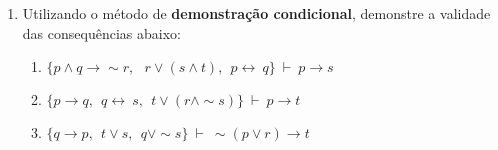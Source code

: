 \documentclass[12pt, a4paper,final]{article}
\begin{document}
\begin{enumerate}
\begin{enumerate}




\end{enumerate}


 \item Utilizando o m\'etodo de {\bf demonstra\c c\~ao condicional}, demonstre a validade das consequ\^encias abaixo:
 
\begin{enumerate}

\item $\{p \wedge q \rightarrow \sim r,\:\: ~ r \vee (s \wedge t),\:\: p \leftrightarrow ~ q \} ~\vdash~  p \rightarrow s $ 



\item $\{p \rightarrow q, \:\: q \leftrightarrow ~ s, \:\: t \vee (r \wedge \sim s) \} ~\vdash~ p \rightarrow t $ 



\item $\{ q \rightarrow p,\:\: t \vee s,\:\: q \vee\sim s \} ~\vdash~ \sim (p \vee r) \rightarrow t$




\begin{comment}


\end{comment}
\end{enumerate}
\end{enumerate}
\end{document}
